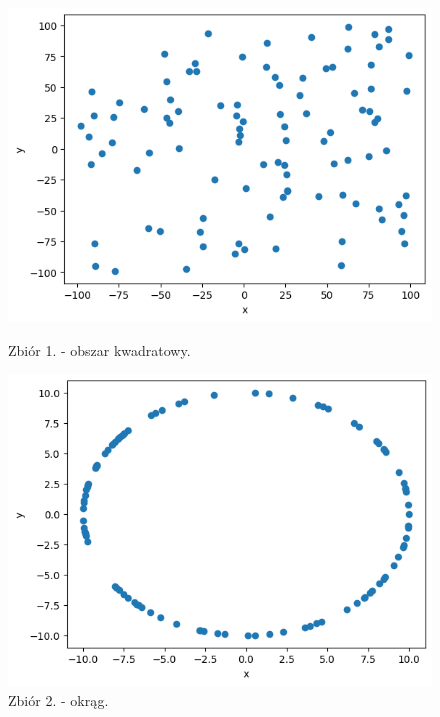 \documentclass[11pt]{scrartcl}
\begin{document}
    \begin{figure}[H]
        \centering
        \begin{minipage}{0.45\linewidth}
          \centering
          \includegraphics[width=1\linewidth]{2_1.png}
          \caption{Zbiór 1. - obszar kwadratowy.}
        \end{minipage}
        \begin{minipage}{0.45\linewidth}
          \centering
          \includegraphics[width=1\linewidth]{2_2.png}
          \caption{Zbiór 2. - okrąg.}
        \end{minipage}
    \end{figure}
\end{document}
